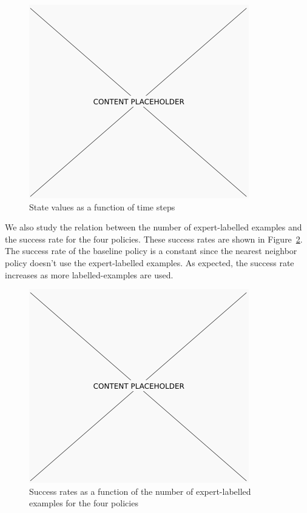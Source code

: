 \begin{figure}[h!]
  \centering
    \includegraphics[width=0.9\linewidth]{figures/placeholder.png}
  \caption{State values as a function of time steps}
  \label{fig:values}
\end{figure}

We also study the relation between the number of expert-labelled examples and the success rate for the four policies.
These success rates are shown in Figure~\ref{fig:number_examples}.
The success rate of the baseline policy is a constant since the nearest neighbor policy doesn't use the expert-labelled examples.
As expected, the success rate increases as more labelled-examples are used.

\begin{figure}[h!]
  \centering
    \includegraphics[width=0.9\linewidth]{figures/placeholder.png}
  \caption{Success rates as a function of the number of expert-labelled examples for the four policies}
  \label{fig:number_examples}
\end{figure}

